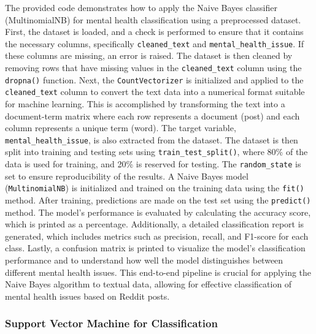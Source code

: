 \noindent
The provided code demonstrates how to apply the Naive Bayes classifier (MultinomialNB) for mental health classification using a preprocessed dataset. First, the dataset is loaded, and a check is performed to ensure that it contains the necessary columns, specifically \texttt{cleaned\_text} and \texttt{mental\_health\_issue}. If these columns are missing, an error is raised. The dataset is then cleaned by removing rows that have missing values in the \texttt{cleaned\_text} column using the \texttt{dropna()} function. Next, the \texttt{CountVectorizer} is initialized and applied to the \texttt{cleaned\_text} column to convert the text data into a numerical format suitable for machine learning. This is accomplished by transforming the text into a document-term matrix where each row represents a document (post) and each column represents a unique term (word). The target variable, \texttt{mental\_health\_issue}, is also extracted from the dataset. The dataset is then split into training and testing sets using \texttt{train\_test\_split()}, where 80\% of the data is used for training, and 20\% is reserved for testing. The \texttt{random\_state} is set to ensure reproducibility of the results. A Naive Bayes model (\texttt{MultinomialNB}) is initialized and trained on the training data using the \texttt{fit()} method. After training, predictions are made on the test set using the \texttt{predict()} method. The model's performance is evaluated by calculating the accuracy score, which is printed as a percentage. Additionally, a detailed classification report is generated, which includes metrics such as precision, recall, and F1-score for each class. Lastly, a confusion matrix is printed to visualize the model's classification performance and to understand how well the model distinguishes between different mental health issues. This end-to-end pipeline is crucial for applying the Naive Bayes algorithm to textual data, allowing for effective classification of mental health issues based on Reddit posts.

\subsubsection{Support Vector Machine for Classification}

